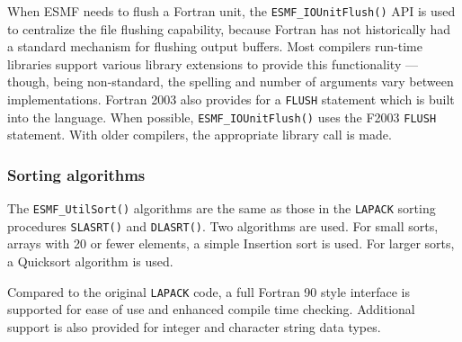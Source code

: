 When ESMF needs to flush a Fortran unit, the {\tt ESMF\_IOUnitFlush()} API is used
to centralize the file flushing capability, because Fortran has not historically
had a standard mechanism for flushing output buffers.  Most compilers run-time libraries
support various library extensions to provide this functionality --- though,
being non-standard, the spelling and number of arguments vary between implementations.
Fortran 2003 also provides for a {\tt FLUSH} statement which is built into the
language.  When possible, {\tt ESMF\_IOUnitFlush()} uses the F2003 {\tt FLUSH} statement.
With older compilers, the appropriate library call is made.

\subsubsection{Sorting algorithms}

The {\tt ESMF\_UtilSort()} algorithms are the same as those in the {\tt LAPACK}
sorting procedures {\tt SLASRT()} and {\tt DLASRT()}.  Two algorithms are used.
For small sorts, arrays with 20 or fewer elements, a simple Insertion sort is
used.  For larger sorts, a Quicksort algorithm is used.

Compared to the original {\tt LAPACK} code, a full Fortran 90 style
interface is supported for ease of use and enhanced compile time checking.
Additional support is also provided for integer and character string data
types.

